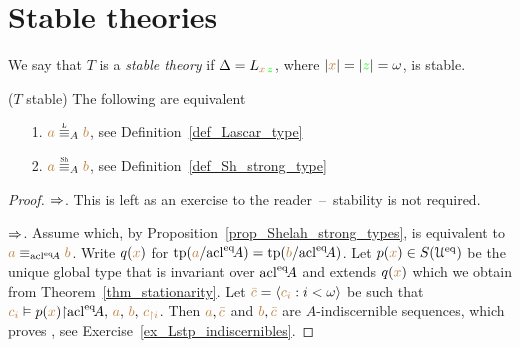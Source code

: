 

\section{Stable theories}
\label{stable_theories}
 We say that $T$ is a \emph{stable theory\/} if $\Delta=L_{{\color{brown} x}\,{\color{green} z}}$, where $|{\color{brown} x}|=|{\color{green} z}|=\omega$, is stable.

\begin{corollary}\label{corol_Ltype_Shtype}
  ($T$ stable)
  The following are equivalent\smallskip
  \begin{itemize}
  \item[1.] ${\mr a}\equivL_A{\mr b}$, see Definition~\ref{def_Lascar_type}\smallskip
  \item[2.] ${\mr a}\equivSh_A{\mr b}$, see Definition~\ref{def_Sh_strong_type}\smallskip
  \end{itemize}
  \end{corollary}
  \begin{proof}$\Rightarrow$.
    This is left as an exercise to the reader~--~stability is not required.
  
    $\Rightarrow$.
    Assume  which, by Proposition~\ref{prop_Shelah_strong_types}, is equivalent to ${\color{brown} a}\equiv_{{\rm acl}^{{\rm eq}}\!A}{\color{brown} b}$.
    Write $q({\color{brown} x})$ for ${\rm tp}({\color{brown} a}/{{\rm acl}}^{{\rm eq}}\!A)={\rm tp}({\color{brown} b}/{{\rm acl}}^{{\rm eq}}\!A)$. Let $p({\color{brown} x})\in S(\EuScript U^{{\rm eq}})$ be the unique global type that is invariant over ${\rm acl}^{{\rm eq}}\!A$ and extends $q({\color{brown} x})$ which we obtain from Theorem~\ref{thm_stationarity}.
    Let ${\color{brown}\bar c}=\langle{\color{brown}c_i}:i<\omega\rangle$ be such that ${\color{brown} c_i}\vDash p({\color{brown} x}){\restriction}{\rm acl}^{{\rm eq}}\!A,\,{\color{brown} a},\,{\color{brown} b},\,{\color{brown} c_{\restriction i}}$.
    Then ${\color{brown} a},{\color{brown}\bar c}$ and ${\color{brown} b},{\color{brown}\bar c}$ are $A$-indiscernible sequences, which proves , see Exercise~\ref{ex_Lstp_indiscernibles}.
  \end{proof}
  

\def\medrel#1{\parbox[t]{6ex}{$\displaystyle\hfil #1$}}
\def\ceq#1#2#3{\parbox[t]{15ex}{$\displaystyle #1$}\medrel{#2}$\displaystyle  #3$}

